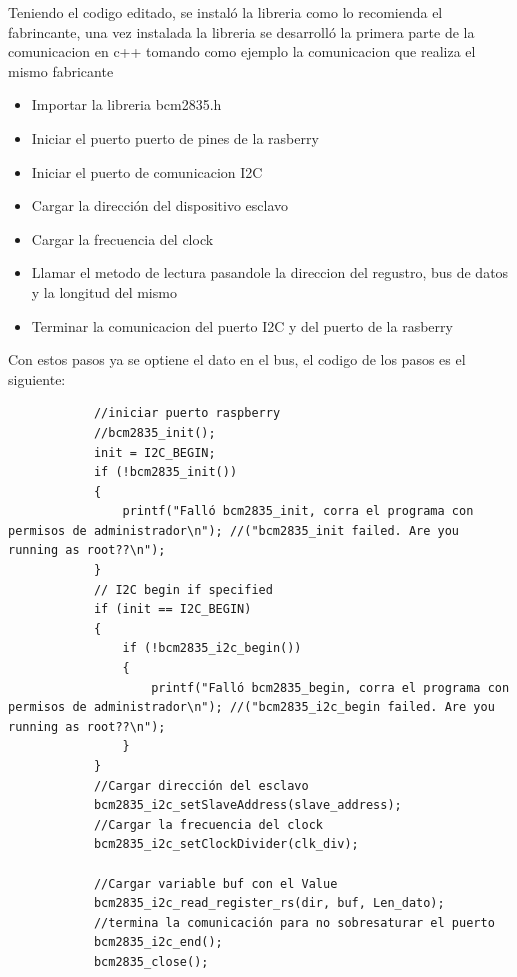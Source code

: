         Teniendo el codigo editado, se instaló la libreria como lo recomienda el fabrincante, una vez instalada la libreria se desarrolló la primera parte de la comunicacion en c++ tomando como ejemplo la comunicacion que realiza el mismo fabricante
        \begin{itemize}
            \item Importar la libreria bcm2835.h
            \item Iniciar el puerto puerto de pines de la rasberry
            \item Iniciar el puerto de comunicacion I2C
            \item Cargar la dirección del dispositivo esclavo
            \item Cargar la frecuencia del clock
            \item Llamar el metodo de lectura pasandole la direccion del regustro, bus de datos y la longitud del mismo
            \item Terminar la comunicacion del puerto I2C y del puerto de la rasberry
        \end{itemize}
        Con estos pasos ya se optiene el dato en el bus, el codigo de los pasos es el siguiente:

        \begin{lstlisting}
            //iniciar puerto raspberry
            //bcm2835_init();
            init = I2C_BEGIN;
            if (!bcm2835_init())
            {
                printf("Falló bcm2835_init, corra el programa con permisos de administrador\n"); //("bcm2835_init failed. Are you running as root??\n");
            }
            // I2C begin if specified
            if (init == I2C_BEGIN)
            {
                if (!bcm2835_i2c_begin())
                {
                    printf("Falló bcm2835_begin, corra el programa con permisos de administrador\n"); //("bcm2835_i2c_begin failed. Are you running as root??\n");
                }
            }
            //Cargar dirección del esclavo
            bcm2835_i2c_setSlaveAddress(slave_address);
            //Cargar la frecuencia del clock
            bcm2835_i2c_setClockDivider(clk_div);

            //Cargar variable buf con el Value
            bcm2835_i2c_read_register_rs(dir, buf, Len_dato);
            //termina la comunicación para no sobresaturar el puerto
            bcm2835_i2c_end();
            bcm2835_close();
        \end{lstlisting}

        
